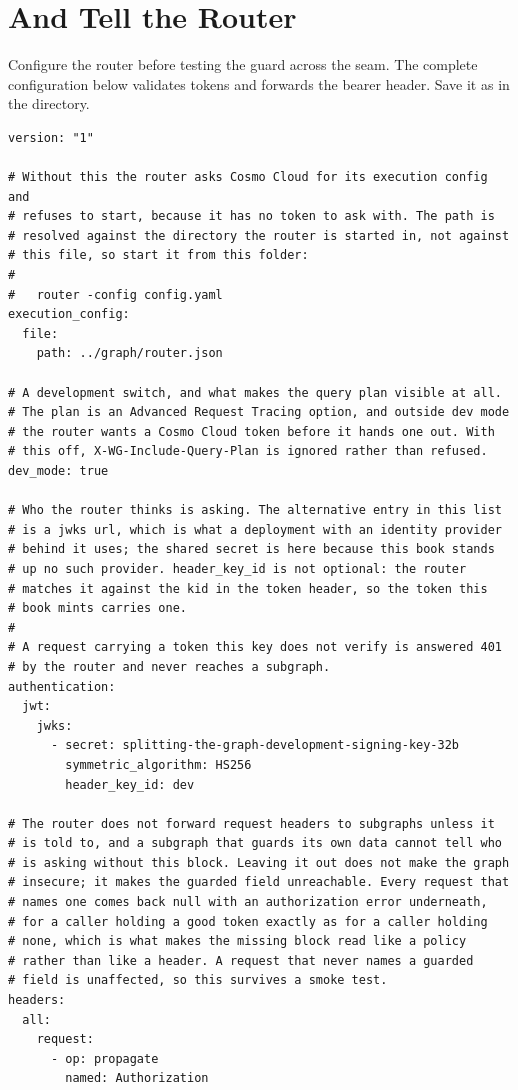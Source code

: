 \section{And Tell the Router}
\label{sec:ch12-and-tell-the-router}

%
Configure the router before testing the guard across the seam.
The complete configuration below validates tokens and forwards the bearer
header. Save it as  in the  directory.

\begin{verbatim}
version: "1"

# Without this the router asks Cosmo Cloud for its execution config and
# refuses to start, because it has no token to ask with. The path is
# resolved against the directory the router is started in, not against
# this file, so start it from this folder:
#
#   router -config config.yaml
execution_config:
  file:
    path: ../graph/router.json

# A development switch, and what makes the query plan visible at all.
# The plan is an Advanced Request Tracing option, and outside dev mode
# the router wants a Cosmo Cloud token before it hands one out. With
# this off, X-WG-Include-Query-Plan is ignored rather than refused.
dev_mode: true

# Who the router thinks is asking. The alternative entry in this list
# is a jwks url, which is what a deployment with an identity provider
# behind it uses; the shared secret is here because this book stands
# up no such provider. header_key_id is not optional: the router
# matches it against the kid in the token header, so the token this
# book mints carries one.
#
# A request carrying a token this key does not verify is answered 401
# by the router and never reaches a subgraph.
authentication:
  jwt:
    jwks:
      - secret: splitting-the-graph-development-signing-key-32b
        symmetric_algorithm: HS256
        header_key_id: dev

# The router does not forward request headers to subgraphs unless it
# is told to, and a subgraph that guards its own data cannot tell who
# is asking without this block. Leaving it out does not make the graph
# insecure; it makes the guarded field unreachable. Every request that
# names one comes back null with an authorization error underneath,
# for a caller holding a good token exactly as for a caller holding
# none, which is what makes the missing block read like a policy
# rather than like a header. A request that never names a guarded
# field is unaffected, so this survives a smoke test.
headers:
  all:
    request:
      - op: propagate
        named: Authorization
\end{verbatim}

